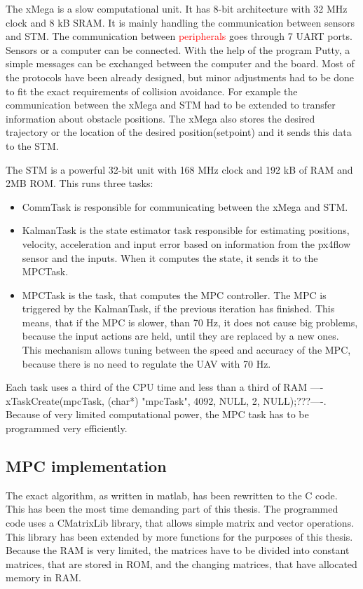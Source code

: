 \documentclass{article}
\begin{document}
The xMega is a slow computational unit. It has 8-bit architecture with 32 MHz clock and 8 kB SRAM. It is mainly handling the communication between sensors and STM. The communication between \textcolor{red}{peripherals} goes through 7 UART ports. Sensors or a computer can be connected. With the help of the program Putty, a simple messages can be exchanged between the computer and the board. Most of the protocols have been already designed, but minor adjustments had to be done to fit the exact requirements of collision avoidance. For example the communication between the xMega and STM had to be extended to transfer information about obstacle positions. The xMega also stores the desired trajectory or the location of the desired position(setpoint) and it sends this data to the STM. 

The STM is a powerful 32-bit unit with 168 MHz clock and 192 kB of RAM and 2MB ROM. This runs three tasks: 

\begin{itemize}
\item CommTask is responsible for communicating between the xMega and STM.

\item KalmanTask is the state estimator task responsible for estimating positions, velocity, acceleration and input error based on information from the px4flow sensor and the inputs. When it computes the state, it sends it to the MPCTask.

\item MPCTask is the task, that computes the MPC controller. The MPC is triggered by the KalmanTask, if the previous iteration has finished. This means, that if the MPC  is slower, than 70 Hz, it does not cause big problems, because the input actions are held, until they are replaced by a new ones. This mechanism allows tuning between the speed and accuracy of the MPC, because there is no need to regulate the UAV with 70 Hz.
\end{itemize}

Each task uses a third of the CPU time and less than a third of RAM ----xTaskCreate(mpcTask, (char*) "mpcTask", 4092, NULL, 2, NULL);???----. Because of very limited computational power, the MPC task has to be programmed very efficiently.

\subsection{MPC implementation}

The exact algorithm, as written in matlab, has been rewritten to the C code. This has been the most time demanding part of this thesis. The programmed code uses a CMatrixLib library, that allows simple matrix and vector operations. This library has been extended by more functions for the purposes of this thesis. Because the RAM is very limited, the matrices have to be divided into constant matrices, that are stored in ROM, and the changing matrices, that have allocated memory in RAM.
\end{document}
